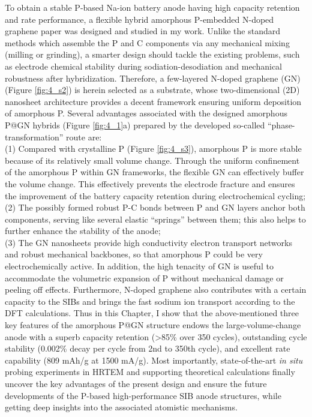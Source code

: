 To obtain a stable P-based Na-ion battery anode having high capacity retention and rate performance, a flexible hybrid amorphous P-embedded N-doped graphene paper was designed and studied in my work. Unlike the standard methods which assemble the P and C components via any mechanical mixing (milling or grinding), a smarter design should tackle the existing problems, such as electrode chemical stability during sodiation-desodiation and mechanical robustness after hybridization. Therefore, a few-layered N-doped graphene (GN) (Figure \ref{fig:4_s2}) is herein selected as a substrate, whose two-dimensional (2D) nanosheet architecture provides a decent framework ensuring uniform deposition of amorphous P.\cite{Nicolosi2013b,Huang2015b} Several advantages associated with the designed amorphous P@GN hybrids (Figure \ref{fig:4_1}a) prepared by the developed so-called “phase-transformation” route are:\\
(1) Compared with crystalline P (Figure \ref{fig:4_s3}), amorphous P is more stable because of its relatively small volume change.\cite{Qian2013b,Kim2013c} Through the uniform confinement of the amorphous P within GN frameworks, the flexible GN can effectively buffer the volume change. This effectively prevents the electrode fracture and ensures the improvement of the battery capacity retention during electrochemical cycling;\\
(2) The possibly formed robust P-C bonds between P and GN layers anchor both components, serving like several elastic “springs” between them; this also helps to further enhance the stability of the anode;\\
(3) The GN nanosheets provide high conductivity electron transport networks and robust mechanical backbones, so that amorphous P could be very electrochemically active. In addition, the high tenacity of GN is useful to accommodate the volumetric expansion of P without mechanical damage or peeling off effects. Furthermore, N-doped graphene also contributes with a certain capacity to the SIBs and brings the fast sodium ion transport according to the DFT calculations.
Thus in this Chapter, I show that the above-mentioned three key features of the amorphous P@GN structure endows the large-volume-change anode with a superb capacity retention (>85\% over 350 cycles), outstanding cycle stability (0.002\% decay per cycle from 2nd to 350th cycle), and excellent rate capability (809 mAh/g at 1500 mA/g). Most importantly, state-of-the-art {\em in situ} probing experiments in HRTEM and supporting theoretical calculations finally uncover the key advantages of the present design and ensure the future developments of the P-based high-performance SIB anode structures, while getting deep insights into the associated atomistic mechanisms. 

